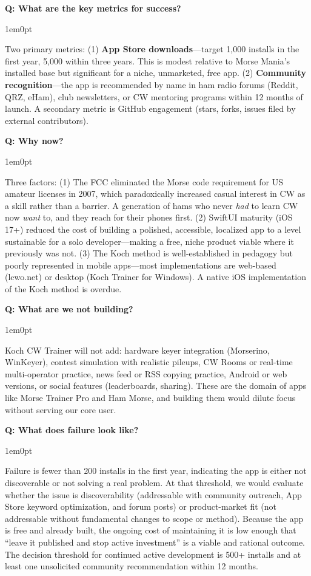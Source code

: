 \documentclass[11pt,letterpaper]{article}
\newenvironment{faqpair}[1]{%
  \vspace{0.5em}%
  \noindent\textbf{\color{SectionBlue}Q: #1}\par%
  \vspace{0.2em}%
  \begin{adjustwidth}{1em}{0pt}%
  \setlength{\parindent}{0pt}%
}{%
  \end{adjustwidth}%
  \vspace{0.5em}%
}
\begin{document}
\begin{faqpair}{What are the key metrics for success?}
  Two primary metrics: (1) \textbf{App Store downloads}---target 1,000 installs in the first year, 5,000 within three years. This is modest relative to Morse Mania's installed base but significant for a niche, unmarketed, free app. (2) \textbf{Community recognition}---the app is recommended by name in ham radio forums (Reddit, QRZ, eHam), club newsletters, or CW mentoring programs within 12 months of launch. A secondary metric is GitHub engagement (stars, forks, issues filed by external contributors).
\end{faqpair}

\begin{faqpair}{Why now?}
  Three factors: (1) The FCC eliminated the Morse code requirement for US amateur licenses in 2007, which paradoxically increased casual interest in CW as a skill rather than a barrier. A generation of hams who never \emph{had} to learn CW now \emph{want} to, and they reach for their phones first. (2) SwiftUI maturity (iOS 17+) reduced the cost of building a polished, accessible, localized app to a level sustainable for a solo developer---making a free, niche product viable where it previously was not. (3) The Koch method is well-established in pedagogy but poorly represented in mobile apps---most implementations are web-based (lcwo.net) or desktop (Koch Trainer for Windows). A native iOS implementation of the Koch method is overdue.
\end{faqpair}

\begin{faqpair}{What are we not building?}
  Koch CW Trainer will not add: hardware keyer integration (Morserino, WinKeyer), contest simulation with realistic pileups, CW Rooms or real-time multi-operator practice, news feed or RSS copying practice, Android or web versions, or social features (leaderboards, sharing). These are the domain of apps like Morse Trainer Pro and Ham Morse, and building them would dilute focus without serving our core user.
\end{faqpair}

\begin{faqpair}{What does failure look like?}
  Failure is fewer than 200 installs in the first year, indicating the app is either not discoverable or not solving a real problem. At that threshold, we would evaluate whether the issue is discoverability (addressable with community outreach, App Store keyword optimization, and forum posts) or product-market fit (not addressable without fundamental changes to scope or method). Because the app is free and already built, the ongoing cost of maintaining it is low enough that ``leave it published and stop active investment'' is a viable and rational outcome. The decision threshold for continued active development is 500+ installs and at least one unsolicited community recommendation within 12 months.
\end{faqpair}
\end{document}
